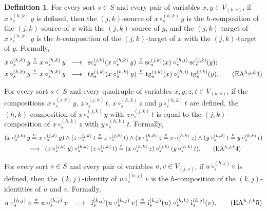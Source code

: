 \documentclass{amsart}
\theoremstyle{plain}
\theoremstyle{definition}
\newtheorem{definition}[theorem]{Definition}
\begin{document}
\begin{definition}
For every sort $s\in S$ and every pair of variables $x,y\in V_{(k,s)}$, if $x\circ^{(h,k)}_{s}y$ is defined, then the $(j,k)$-source of $x\circ^{(h,k)}_{s}y$ is the $h$-composition of the $(j,k)$-source of $x$ with the $(j,k)$-source of $y$, and the $(j,k)$-target of $x\circ^{(h,k)}_{s}y$ is the $h$-composition of the $(j,k)$-target of $x$ with the $(j,k)$-target of $y$. Formally,
\allowdisplaybreaks
\begin{align*}
x\circ^{(h,k)}_{s}y&\overset{\mathrm{e}}{=}x\circ^{(h,k)}_{s}y \;\;\longrightarrow\;\;
\mathrm{sc}^{(j,k)}_{s}(x\circ^{(h,k)}_{s}y)\overset{\mathrm{e}}{=}\mathrm{sc}^{(j,k)}_{s}(x)\circ^{(h,j)}_{s}\mathrm{sc}^{(j,k)}_{s}(y);\\
x\circ^{(h,k)}_{s}y&\overset{\mathrm{e}}{=}x\circ^{(h,k)}_{s}y \;\;\longrightarrow\;\;
\mathrm{tg}^{(j,k)}_{s}(x\circ^{(h,k)}_{s}y)\overset{\mathrm{e}}{=}\mathrm{tg}^{(j,k)}_{s}(x)\circ^{(h,j)}_{s}\mathrm{tg}^{(j,k)}_{s}(y).
\label{DVarExtendedEAhjk3}\tag{EA$^{h,j,k}$3}
\end{align*}

For every sort $s\in S$ and every quadruple of variables $x,y,z,t\in V_{(k,s)}$, if the compositions $x\circ^{(j,k)}_{s}y$, $z\circ^{(j,k)}_{s}t$, $x\circ^{(h,k)}_{s}z$ and $y\circ^{(h,k)}_{s}t$ are defined, the $(h,k)$-composition of $x\circ^{(j,k)}_{s}y$ with $z\circ^{(j,k)}_{s}t$ is equal to the $(j,k)$-composition of $x\circ^{(h,k)}_{s}z$ with $y\circ^{(h,k)}_{s}t$. Formally,
\allowdisplaybreaks
\begin{multline*}
(x\circ^{(j,k)}_{s}y\overset{\mathrm{e}}{=}x\circ^{(j,k)}_{s}y)
\wedge
(z\circ^{(j,k)}_{s}t\overset{\mathrm{e}}{=}z\circ^{(j,k)}_{s}t)
\wedge
(x\circ^{(h,k)}_{s}z\overset{\mathrm{e}}{=}x\circ^{(h,k)}_{s}z)
\wedge
(y\circ^{(h,k)}_{s}t\overset{\mathrm{e}}{=}y\circ^{(h,k)}_{s}t)
\\
\;\;\longrightarrow\;\;
(x\circ^{(j,k)}_{s}y)\circ^{(h,k)}_{s}(z\circ^{(j,k)}_{s}t)\overset{\mathrm{e}}{=}
(x\circ^{(h,k)}_{s}z)\circ^{(j,k)}_{s}(y\circ^{(h,k)}_{s}t).
\label{DVarExtendedEAhjk4}\tag{EA$^{h,j,k}$4}
\end{multline*}

For every sort $s\in S$ and every pair of variables $u,v\in V_{(j,s)}$, if $u\circ^{(h,j)}_{s}v$ is defined, then the $(k,j)$-identity of $u\circ^{(h,j)}_{s}v$ is the $h$-composition of the $(k,j)$-identities of $u$ and $v$. Formally,
\allowdisplaybreaks
\begin{align*}
u\circ^{(h,j)}_{s}v\overset{\mathrm{e}}{=}u\circ^{(h,j)}_{s}v \;\;\longrightarrow\;\;
\mathrm{i}^{(k,j)}_{s}(u\circ^{(h,j)}_{s}v)\overset{\mathrm{e}}{=}\mathrm{i}^{(k,j)}_{s}(u)\circ^{(h,k)}_{s}\mathrm{i}^{(k,j)}_{s}(v).
\label{DVarExtendedEAhjk5}\tag{EA$^{h,j,k}$5}
\end{align*}


\end{definition}
\end{document}
